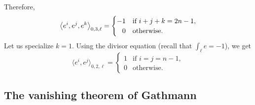\documentclass[pdftex]{sigma}
\numberwithin{equation}{section}
\begin{document}
Therefore,
\[%
\big\langle e^i,e^j,e^k\big\rangle_{0,3,\ell} =
\begin{cases}
-1 & \mbox{if } i+j+k=2n-1,\\
\hphantom{-}0 & \mbox{otherwise}.
\end{cases}
\]
Let us specialize $k=1$. Using the divisor equation (recall that $\int_\ell e=-1$), we get
\[%
\big\langle e^i,e^j\big\rangle_{0,2,\ell} =
\begin{cases}
1 & \mbox{if } i=j=n-1,\\
0 & \mbox{otherwise}.
\end{cases}
\]

\subsection{The vanishing theorem of Gathmann}
\end{document}

